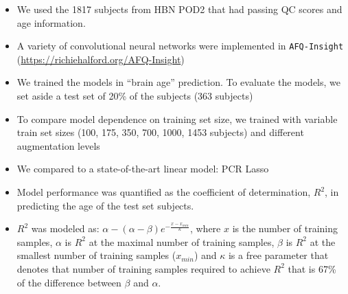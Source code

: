 \documentclass[a0paper,landscape,fontscale=0.365]{baposter}
\begin{document}
\begin{poster}
{\begin{itemize}[nosep, leftmargin=*]
\item We used the 1817 subjects from HBN POD2 that had passing QC scores and age
information.

\item A variety of convolutional neural networks were implemented in \texttt{AFQ-Insight} (\url{https://richiehalford.org/AFQ-Insight})

\item We trained the models in ``brain age'' prediction. To evaluate the models, we set aside a test set of 20\% of the subjects (363 subjects)

\item To compare model dependence on training set size, we trained with variable train set sizes (100, 175, 350, 700, 1000, 1453 subjects) and different augmentation levels

\item We compared to a state-of-the-art linear model: PCR Lasso \cite{richford2021sgl}

\item Model performance was quantified as the coefficient of determination, $R^2$, in predicting the age of the test set subjects.

\item $R^2$ was modeled as: $\alpha - (\alpha - \beta) e^{-\frac{x - x_{min}}{\kappa}}$, where $x$ is the number of training samples, $\alpha$ is $R^2$ at the maximal number of training samples, $\beta$ is $R^2$ at the smallest number of training samples ($x_{min}$) and $\kappa$ is a free parameter that denotes that number of training samples required to achieve $R^2$ that is 67\% of the difference between $\beta$ and $\alpha$.

\end{itemize}
}


\end{poster}
\end{document}
